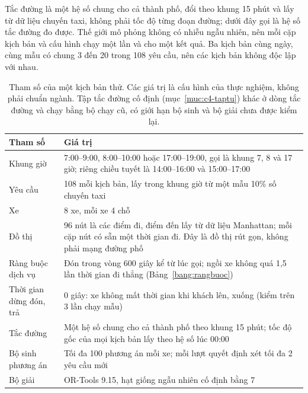 Tắc đường là một hệ số chung cho cả thành phố, đổi theo khung 15 phút và lấy từ dữ liệu chuyến taxi, không phải tốc độ
từng đoạn đường; dưới đây gọi là hệ số tắc đường đo được. Thế giới mô phỏng không có nhiễu ngẫu nhiên, nên mỗi cặp
kịch bản và cấu hình chạy một lần và cho một kết quả. Ba kịch bản cùng ngày, cùng mẫu có chung 3 đến 20 trong 108 yêu
cầu, nên các kịch bản không độc lập với nhau.

\begin{table}[htbp]
\centering
\caption{Tham số của một kịch bản thử. Các giá trị là cấu hình của thực nghiệm, không phải chuẩn ngành. Tập tắc
đường cố định (mục~\ref{muc:c4-taptu}) khác ở dòng tắc đường và chạy bằng bộ chạy cũ, có giới hạn bộ sinh và bộ
giải chưa được kiểm lại.}
\label{bang:c4-thamso}
\small
\begin{tabular}{@{}p{4.0cm}p{11.0cm}@{}}
\toprule
\textbf{Tham số} & \textbf{Giá trị}\\
\midrule
Khung giờ & 7:00--9:00, 8:00--10:00 hoặc 17:00--19:00, gọi là khung 7, 8 và 17 giờ; riêng chiều tuyết
là 14:00--16:00 và 15:00--17:00\\
Yêu cầu & 108 mỗi kịch bản, lấy trong khung giờ từ một mẫu 10\% số chuyến taxi\\
Xe & 8 xe, mỗi xe 4 chỗ\\
Đồ thị & 96 nút là các điểm đi, điểm đến lấy từ dữ liệu Manhattan; mỗi cặp nút có sẵn một thời gian đi. Đây là
đồ thị rút gọn, không phải mạng đường phố\\
Ràng buộc dịch vụ & Đón trong vòng 600 giây kể từ lúc gọi; ngồi xe không quá 1,5 lần thời gian đi
thẳng (Bảng~\ref{bang:rangbuoc})\\
Thời gian dừng đón, trả & 0 giây: xe không mất thời gian khi khách lên, xuống (kiểm trên 3 lần chạy mẫu)\\
Tắc đường & Một hệ số chung cho cả thành phố theo khung 15 phút; tốc độ gốc của mọi kịch bản lấy theo hệ số lúc
00:00\\
Bộ sinh phương án & Tối đa 100 phương án mỗi xe; mỗi lượt quyết định xét tối đa 2 yêu cầu mới\\
Bộ giải & OR-Tools 9.15, hạt giống ngẫu nhiên cố định bằng 7\\
\bottomrule
\end{tabular}
\end{table}

